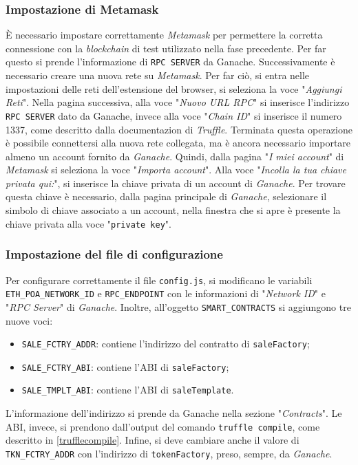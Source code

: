 \documentclass[a4paper]{article}
\begin{document}
        \subsubsection{Impostazione di Metamask}
        È necessario impostare correttamente \emph{Metamask} per permettere la corretta connessione con la \emph{blockchain} di test utilizzato nella fase precedente.
        Per far questo si prende l'informazione di \verb|RPC SERVER| da Ganache. Successivamente è necessario creare una nuova rete su \emph{Metamask}. Per far ciò, si entra nelle impostazioni delle reti dell'estensione del browser, si seleziona la voce "\emph{Aggiungi Reti}".
        Nella pagina successiva, alla voce "\emph{Nuovo URL RPC}" si inserisce l'indirizzo \verb|RPC SERVER| dato da Ganache, invece alla voce "\emph{Chain ID}" si inserisce il numero 1337, come descritto dalla documentazion di \emph{Truffle}\cite{trufflechain}.
        Terminata questa operazione è possibile connettersi alla nuova rete collegata, ma è ancora necessario importare almeno un account fornito da \emph{Ganache}. Quindi, dalla pagina "\emph{I miei account}" di \emph{Metamask} si seleziona la voce "\emph{Importa account}".
        Alla voce "\emph{Incolla la tua chiave privata qui:}", si inserisce la chiave privata di un account di \emph{Ganache}. Per trovare questa chiave è necessario, dalla pagina principale di \emph{Ganache}, selezionare il simbolo di chiave associato a un account, nella finestra che si apre è presente la chiave privata alla voce "\verb|private key|".
        \subsubsection{Impostazione del file di configurazione}
        Per configurare correttamente il file \verb|config.js|, si modificano le variabili \verb|ETH_POA_NETWORK_ID| e \verb|RPC_ENDPOINT| con le informazioni di "\emph{Network ID}" e "\emph{RPC Server}" di \emph{Ganache}.
        Inoltre, all'oggetto \verb|SMART_CONTRACTS| si aggiungono tre nuove voci:
        \begin{itemize}
          \item \verb|SALE_FCTRY_ADDR|: contiene l'indirizzo del contratto di \verb|saleFactory|;
          \item \verb|SALE_FCTRY_ABI|: contiene l'ABI di \verb|saleFactory|;
          \item \verb|SALE_TMPLT_ABI|: contiene l'ABI di \verb|saleTemplate|.
        \end{itemize}
        L'informazione dell'indirizzo si prende da Ganache nella sezione "\emph{Contracts}". Le ABI, invece, si prendono dall'output del comando \verb|truffle compile|, come descritto in \ref{trufflecompile}.
        \newline
        Infine, si deve cambiare anche il valore di \verb|TKN_FCTRY_ADDR| con l'indirizzo di \verb|tokenFactory|, preso, sempre, da \emph{Ganache}.
\end{document}
